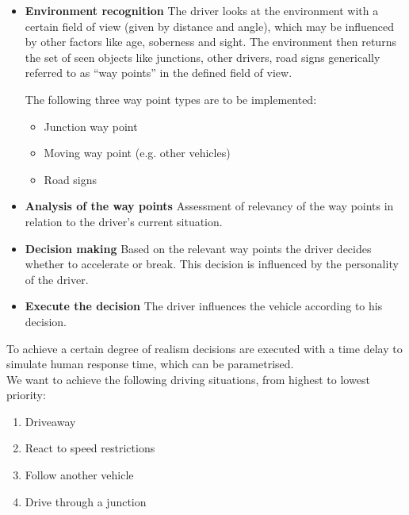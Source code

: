 \documentclass[a4paper,10pt,titlepage]{article}
\begin{document}
 \begin{itemize}
	\item \textbf{Environment recognition}\newline
				The driver looks at the environment with a certain field of view (given by distance and angle), which
				may be influenced by other factors like age, soberness and sight. The environment then returns the set 
				of seen objects like junctions, other drivers, road signs generically referred to as ``way points''
				in the defined field of view.

				The following three way point types are to be implemented:
				\begin{itemize}
					\item Junction way point
					\item Moving way point (e.g. other vehicles)
					\item Road signs
				\end{itemize}

	\item \textbf{Analysis of the way points}\newline
				Assessment of relevancy of the way points in relation to the driver's current situation.

	\item \textbf{Decision making}\newline
				Based on the relevant way points the driver decides whether to accelerate or break. This
				decision is influenced by the personality of the driver.

	\item \textbf{Execute the decision}\newline
				The driver influences the vehicle according to his decision.

 \end{itemize}

 To achieve a certain degree of realism decisions are executed with a time delay to simulate human response time,
 which can be parametrised.\\

 We want to achieve the following driving situations, from highest to lowest priority:
 \begin{enumerate}
	\item Driveaway
	\item React to speed restrictions
	\item Follow another vehicle
	\item Drive through a junction
 \end{enumerate}
\end{document}
